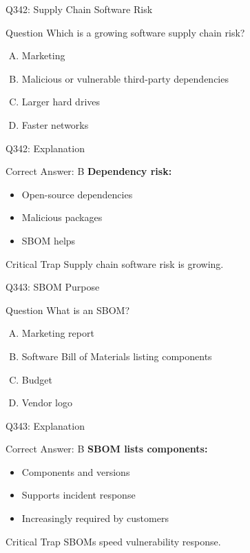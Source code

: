 \documentclass{beamer}
\begin{document}
	\begin{frame}{Q342: Supply Chain Software Risk}
		\begin{block}{Question}
			Which is a growing software supply chain risk?
		\end{block}
		\begin{enumerate}[(A)]
			\item Marketing
			\item Malicious or vulnerable third-party dependencies
			\item Larger hard drives
			\item Faster networks
		\end{enumerate}
	\end{frame}
	
	\begin{frame}{Q342: Explanation}
		\begin{block}{Correct Answer: B}
			\textbf{Dependency risk:}
			\begin{itemize}
				\item Open-source dependencies
				\item Malicious packages
				\item SBOM helps
			\end{itemize}
		\end{block}
		\begin{alertblock}{Critical Trap}
			Supply chain software risk is growing.
		\end{alertblock}
	\end{frame}
	
	\begin{frame}{Q343: SBOM Purpose}
		\begin{block}{Question}
			What is an SBOM?
		\end{block}
		\begin{enumerate}[(A)]
			\item Marketing report
			\item Software Bill of Materials listing components
			\item Budget
			\item Vendor logo
		\end{enumerate}
	\end{frame}
	
	\begin{frame}{Q343: Explanation}
		\begin{block}{Correct Answer: B}
			\textbf{SBOM lists components:}
			\begin{itemize}
				\item Components and versions
				\item Supports incident response
				\item Increasingly required by customers
			\end{itemize}
		\end{block}
		\begin{alertblock}{Critical Trap}
			SBOMs speed vulnerability response.
		\end{alertblock}
	\end{frame}
	
\end{document}
